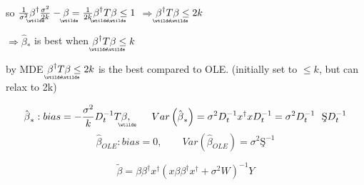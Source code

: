 \documentclass{article}
\begin{document}
so $\frac{1}{\sigma ^{2}}%
\underaccent{\wtilde}{\beta}%
^{\dagger }\frac{\sigma ^{2}}{2k}-%
\underaccent{\wtilde}{\beta}%
=\frac{1}{2k}%
\underaccent{\wtilde}{\beta}%
^{\dagger }T%
\underaccent{\wtilde}{\beta}%
\leq 1$ $\Rightarrow $\underline{$%
\underaccent{\wtilde}{\beta}%
^{\dagger }T%
\underaccent{\wtilde}{\beta}%
\leq 2k$}

$\Rightarrow \hat{\beta}_{\ast }$ is best when $%
\underaccent{\wtilde}{\beta}%
^{\dagger }T%
\underaccent{\wtilde}{\beta}%
\leq k$

by MDE $%
\underaccent{\wtilde}{\beta}%
^{\dagger }T%
\underaccent{\wtilde}{\beta}%
\leq 2k$ is the best compared to OLE. (initially set to $\leq k$, but can
relax to 2k)

\bigskip

\begin{equation*}
\hat{\beta}_{\ast }:bias=-\frac{\sigma ^{2}}{k}D_{t}^{-1}T%
\underaccent{\wtilde}{\beta}%
,\qquad Var\left( \hat{\beta}_{\ast }\right) =\sigma
^{2}D_{t}^{-1}x^{\dagger }xD_{t}^{-1}=\sigma ^{2}D_{t}^{-1}\text{\c{S}}%
D_{t}^{-1}
\end{equation*}%
\begin{equation*}
\hat{\beta}_{OLE}:bias=0,\qquad Var\left( \hat{\beta}_{OLE}\right) =\sigma
^{2}\text{\c{S}}^{-1}
\end{equation*}

\bigskip

\begin{equation*}
\tilde{\beta}=\beta \beta ^{\dagger }x^{\dagger }\left( x\beta \beta
^{\dagger }x^{\dagger }+\sigma ^{2}W\right) ^{-1}Y
\end{equation*}
\end{document}
